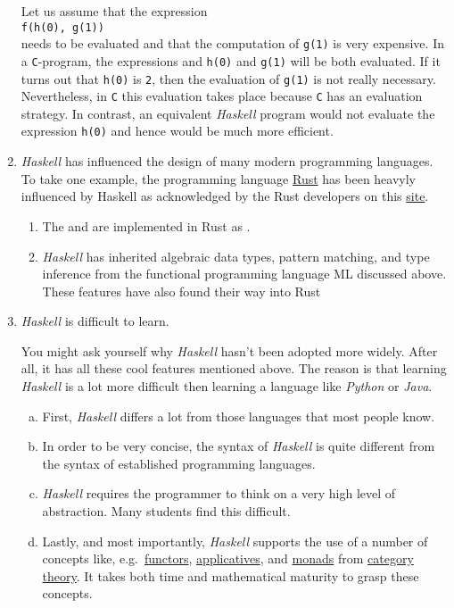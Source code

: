 \begin{enumerate}
Let us assume that the expression
\\[0.2cm]
\hspace*{1.3cm}
\texttt{f(h(0), g(1))}
\\[0.2cm]
needs to be evaluated and that the computation of \texttt{g(1)} is very expensive.  In a
\texttt{C}-program, the expressions and \texttt{h(0)} and \texttt{g(1)} will be both evaluated.  If it turns out that
\texttt{h(0)} is \texttt{2}, then the evaluation of \texttt{g(1)} is not really necessary.  Nevertheless, in \texttt{C} this
evaluation takes place because \texttt{C} has an  evaluation strategy.  In contrast, an equivalent
\textsl{Haskell} program would not evaluate the expression \texttt{h(0)} and hence would be much more efficient.
\item \textsl{Haskell} has influenced the design of many modern programming languages. To take one example,
      the programming language \href{https://en.wikipedia.org/wiki/Rust_(programming_language)}{Rust} has been
      heavyly influenced by Haskell as acknowledged by the Rust developers on this
      \href{https://doc.rust-lang.org/reference/influences.html}{site}.
      \begin{enumerate}
      \item The  and  are implemented in Rust as
            .
      \item \textsl{Haskell} has inherited algebraic data types, pattern matching, and type inference from
            the functional programming language ML discussed above.  These features have also found their way
            into Rust
      \end{enumerate}
\item \textsl{Haskell} is difficult to learn.

  You might ask yourself why \textsl{Haskell} hasn't been adopted more widely.  After all, it has all these
  cool features mentioned above.  The reason is that learning \textsl{Haskell} is a lot more difficult then
  learning a language like \textsl{Python} or \textsl{Java}.  
  \begin{enumerate}[(a)]
  \item First, \textsl{Haskell} differs a lot from those languages that most people know.
  \item In order to be very concise, the syntax of \textsl{Haskell} is quite different from the syntax of
        established programming languages.
  \item \textsl{Haskell} requires the programmer to think on a very high level of abstraction.
        Many students find this difficult.
  \item Lastly, and most importantly, \textsl{Haskell} supports the use of a number of concepts
        like, e.g.~\href{https://en.wikipedia.org/wiki/Functor}{functors},
        \href{https://en.wikipedia.org/wiki/Applicative_functor}{applicatives}, and
        \href{https://en.wikipedia.org/wiki/Monad_(category_theory)}{monads} from 
        \href{https://en.wikipedia.org/wiki/Category_theory}{category theory}. 
        It takes both time and mathematical maturity to grasp these concepts.


\end{enumerate}
\end{enumerate}
